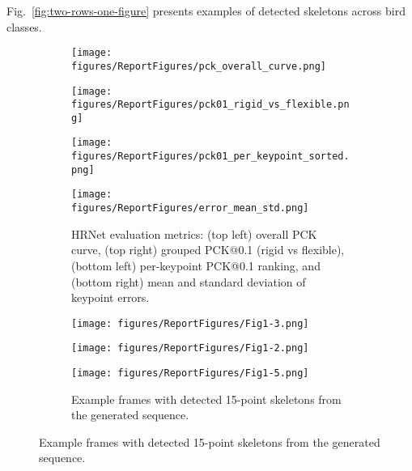 \documentclass[final-report]{report-template}
\begin{document}
Fig.~\ref{fig:two-rows-one-figure} presents examples of detected skeletons across bird classes.


\newlength{\TopCellH}\setlength{\TopCellH}{4.5cm}
\newlength{\BotCellH}\setlength{\BotCellH}{3.3cm}

\begin{figure}[H]
\centering

\begin{subfigure}[t]{\textwidth}
  \begin{minipage}[t]{0.44\textwidth}
    \centering
    \texttt{[image: figures/ReportFigures/pck\_overall\_curve.png]}
  \end{minipage}\hspace{1cm}
  \begin{minipage}[t]{0.42\textwidth}
    \raggedright
    \texttt{[image: figures/ReportFigures/pck01\_rigid\_vs\_flexible.png]}
  \end{minipage}

  \begin{minipage}[t]{0.49\textwidth}
    \centering
    \texttt{[image: figures/ReportFigures/pck01\_per\_keypoint\_sorted.png]}
  \end{minipage}\hfill
  \begin{minipage}[t]{0.49\textwidth}
    \centering
    \texttt{[image: figures/ReportFigures/error\_mean\_std.png]}
  \end{minipage}

  \caption{HRNet evaluation metrics: (top left) overall PCK curve, (top right) grouped PCK@0.1 (rigid vs flexible), 
(bottom left) per-keypoint PCK@0.1 ranking, and (bottom right) mean and standard deviation of keypoint errors.
}
  \label{fig:hrnet_metrics}
\end{subfigure}

\vspace{0.7em}

\begin{subfigure}[t]{\textwidth}
  \centering
  \begin{minipage}[t]{0.32\textwidth}\centering
    \texttt{[image: figures/ReportFigures/Fig1-3.png]}
  \end{minipage}\hfill
  \begin{minipage}[t]{0.32\textwidth}\centering
    \texttt{[image: figures/ReportFigures/Fig1-2.png]}
  \end{minipage}\hfill
  \begin{minipage}[t]{0.32\textwidth}\centering
    \texttt{[image: figures/ReportFigures/Fig1-5.png]}
  \end{minipage}
  \caption{Example frames with detected 15-point skeletons from the generated sequence.}
  \label{fig:row_bottom}
\end{subfigure}


\end{figure}
\end{document}
